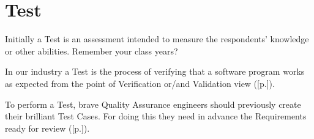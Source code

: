 \section{Test}
\label{sec:Test}

Initially a Test is an assessment intended to measure the respondents' knowledge or other abilities. Remember your class years?

In our industry a Test is the process of verifying that a software program works as expected from the point of Verification or/and Validation view ([p.\pageref{sec:Verification}]).

To perform a Test, brave Quality Assurance engineers should previously create their brilliant Test Cases. For doing this they need in advance the Requirements ready for review ([p.\pageref{sec:Requirement}]).

